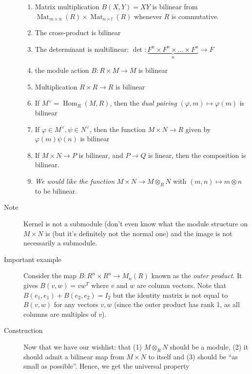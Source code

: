 \documentclass[12pt]{article}
\newcommand{\Hom}{\operatorname{Hom}}
\newcommand{\Mat}{\operatorname{Mat}}
\begin{document}
\begin{description}
\begin{enumerate}
  \item Matrix multiplication $B(X,Y) = XY$ is bilinear from
    $\Mat_{m\times n}(R) \times \Mat_{n\times l}(R)$ whenever $R$ is
    commutative. 
  \item The cross-product is bilinear
  \item The determinant is multilinear: $\det: \underbrace{F^n \times F^n \times
    \dotsc \times F^n}_n \rightarrow F$
\item the module action $B: R\times M \rightarrow M$ is bilinear
\item Multiplication $R\times R \rightarrow R$ is bilinear
\item If $M^\vee=\Hom_R(M,R)$, then the \emph{dual pairing}
  $(\varphi, m) \mapsto \varphi(m)$ is bilinear
\item If $\varphi \in M^\vee, \psi \in N^\vee$, then the function
  $M\times N \rightarrow R$ given by $\varphi(m)\psi(n)$ is bilinear
\item If $M\times N\rightarrow P$ is bilinear, and $P\rightarrow Q$ is
  linear, then the composition is bilinear. 
\item \emph{We would like the function} $M\times N \rightarrow
  M\otimes_R N$ with $(m,n)\mapsto m\otimes n$ to be bilinear. 
  \end{enumerate}
\item[Note] Kernel is not a submodule (don't even know what the module
  structure on $M\times N$ is (but it's definitely not the normal one)
  and the image is not necessarily a submodule. 
\item[Important example] Consider the map $B: R^n \times R^n
  \rightarrow M_n(R)$ known as the \emph{outer product}. It gives
  $B(v,w) = vw^T$ where $v$ and $w$ are column vectors. Note that
  $B(e_1,e_1)+B(e_2,e_2) = I_2$ but the identity matrix is not equal
  to $B(v,w)$ for any vectors $v,w$ (since the outer product has rank
  1, as all columns are multiples of $v$). 
\item[Construction] Now that we have our wishlist: that (1) $M\otimes_R N$
  should be a module, (2) it should admit a bilinear map from $M\times
  N$ to itself and (3) should be ``as small as possible''. Hence, we
  get the universal property
\end{description}
\end{document}

